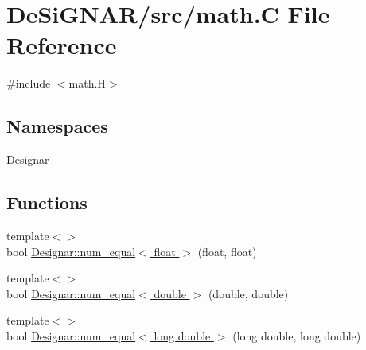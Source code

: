 \hypertarget{math_8_c}{}\section{De\+Si\+G\+N\+A\+R/src/math.C File Reference}
\label{math_8_c}
{\ttfamily \#include $<$math.\+H$>$}\newline
\subsection*{Namespaces}
\begin{DoxyCompactItemize}
\item 
 \hyperlink{namespace_designar}{Designar}
\end{DoxyCompactItemize}
\subsection*{Functions}
\begin{DoxyCompactItemize}
\item 
{\footnotesize template$<$$>$ }\\bool \hyperlink{namespace_designar_a29878d27cf434c0bac7093ec7b4d8613}{Designar\+::num\+\_\+equal$<$ float $>$} (float, float)
\item 
{\footnotesize template$<$$>$ }\\bool \hyperlink{namespace_designar_abc6408777e04d2c538830bf826901317}{Designar\+::num\+\_\+equal$<$ double $>$} (double, double)
\item 
{\footnotesize template$<$$>$ }\\bool \hyperlink{namespace_designar_a161c5a6c7e958d708e5898265c9a37f7}{Designar\+::num\+\_\+equal$<$ long double $>$} (long double, long double)
\end{DoxyCompactItemize}
